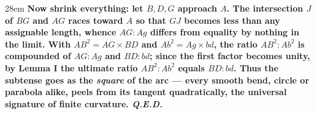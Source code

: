 \documentclass[border=4pt]{standalone}
\begin{document}
\begin{varwidth}{28em}
\large\bfseries
Now shrink everything: let $B,D,G$ approach $A$. The intersection $J$ of $BG$ and      $AG$ races toward $A$ so that \textcolor{relorange}{$GJ$ becomes less than any assignable      length}, whence $AG:Ag$ differs from equality by nothing in the limit. With      \textcolor{relorange}{$AB^{2}=AG\times BD$} and $Ab^{2}=Ag\times bd$, the ratio $AB^{2}:Ab^{2}$      is compounded of $AG:Ag$ and $BD:bd$; since the first factor becomes unity, by      Lemma I the ultimate ratio $AB^{2}:Ab^{2}$ equals $BD:bd$. Thus the \textcolor{subred}{subtense}      goes as the \textit{square} of the \textcolor{arcgreen}{arc} — every smooth bend, circle or      parabola alike, peels from its \textcolor{tanblue}{tangent} quadratically, the universal      signature of finite curvature. \textit{Q.E.D.}
\end{varwidth}
\end{document}
